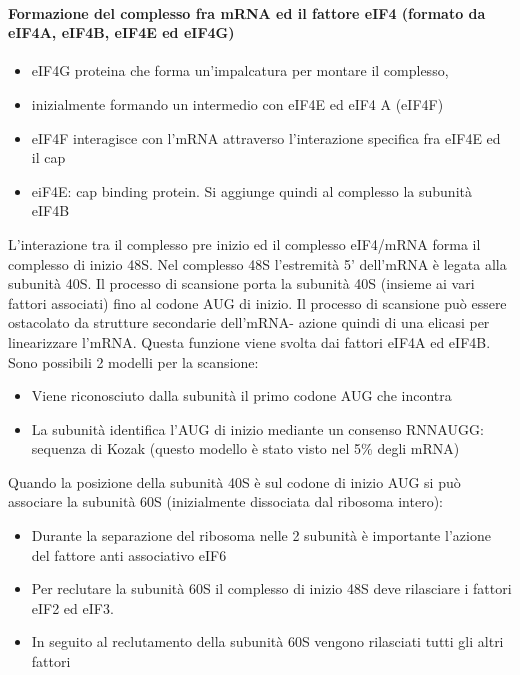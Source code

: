 \documentclass{article}
\begin{document}
\paragraph{Formazione del complesso fra mRNA ed il fattore eIF4 (formato da eIF4A, eIF4B, eIF4E ed eIF4G)}
\begin{itemize}
    \item eIF4G proteina che forma un'impalcatura per montare il
    complesso,
    \item inizialmente formando un intermedio con eIF4E ed eIF4 A
    (eIF4F)
    \item eIF4F interagisce con l'mRNA attraverso l'interazione specifica
    fra eIF4E ed il cap
    \item eiF4E: cap binding protein. Si aggiunge quindi al complesso la subunità eIF4B
\end{itemize}
L'interazione tra il complesso pre inizio ed il
complesso eIF4/mRNA forma il complesso di inizio
48S.
Nel complesso 48S l'estremità 5' dell'mRNA è
legata alla subunità 40S. Il processo di scansione
porta la subunità 40S (insieme ai vari fattori
associati) fino al codone AUG di inizio.
Il processo di scansione può essere ostacolato da strutture secondarie
dell'mRNA- azione quindi di una elicasi per linearizzare l'mRNA. Questa
funzione viene svolta dai fattori eIF4A ed eIF4B. Sono possibili 2 modelli per la scansione:
\begin{itemize}
    \item Viene riconosciuto dalla subunità il primo codone AUG che incontra
    \item La subunità identifica l'AUG di inizio mediante un consenso RNNAUGG:
    sequenza di Kozak (questo modello è stato visto nel 5\% degli mRNA)
\end{itemize}
Quando la posizione della subunità 40S è sul codone di
inizio AUG si può associare la subunità 60S (inizialmente
dissociata dal ribosoma intero):
\begin{itemize}
    \item Durante la separazione del ribosoma nelle 2
    subunità è importante l'azione del fattore anti
    associativo eIF6
    \item Per reclutare la subunità 60S il complesso di inizio
    48S deve rilasciare i fattori eIF2 ed eIF3.
    \item In seguito al reclutamento della subunità 60S
    vengono rilasciati tutti gli altri fattori
\end{itemize}
\end{document}
